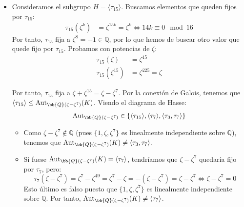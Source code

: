 \begin{ejemplo}
\begin{itemize}
\begin{itemize}
            Por tanto, $\Aut_{\bb{Q}(\zeta^3+\zeta^5)}(K) = \langle \tau_7\rangle$, y por la conexión de Galois:
            \begin{equation*}
                K^{\langle \tau_7\rangle} = \bb{Q}(\zeta^3+\zeta^5)
            \end{equation*}

            \item Consideramos el subgrupo $H = \langle \tau_{15}\rangle$. Buscamos elementos que queden fijos por $\tau_{15}$:
            \begin{align*}
                \tau_{15}(\zeta^k) &= \zeta^{15k} = \zeta^k \iff 14k \equiv 0 \mod 16
            \end{align*}
            Por tanto, $\tau_{15}$ fija a $\zeta^8=-1\in \mathbb{Q}$, por lo que hemos de buscar otro valor que quede fijo por $\tau_{15}$. Probamos con potencias de $\zeta$:
            \begin{align*}
                \tau_{15}(\zeta) &= \zeta^{15} \\
                \tau_{15}(\zeta^{15}) &= \zeta^{225} = \zeta
            \end{align*}

            Por tanto, $\tau_{15}$ fija a $\zeta+\zeta^{15}=\zeta-\zeta^7$. Por la conexión de Galois, tenemos que $\langle \tau_{15}\rangle\leq \Aut_{\bb{Q}(\zeta-\zeta^7)}(K)$. Viendo el diagrama de Hasse:
            \begin{equation*}
                \Aut_{\bb{Q}(\zeta-\zeta^7)} \in \{\langle \tau_{15}\rangle, \langle \tau_7\rangle, \langle \tau_3, \tau_7\rangle\}
            \end{equation*}
            \begin{itemize}
                \item Como $\zeta-\zeta^7\notin \mathbb{Q}$ (pues $\{1,\zeta,\zeta^{7}\}$ es linealmente independiente sobre $\mathbb{Q}$), tenemos que $\Aut_{\bb{Q}(\zeta-\zeta^7)}(K)\neq \langle \tau_3, \tau_7\rangle$.
                \item Si fuese $\Aut_{\bb{Q}(\zeta-\zeta^7)}(K) = \langle \tau_7\rangle$, tendríamos que $\zeta-\zeta^7$ quedaría fijo por $\tau_7$, pero:
                \begin{equation*}
                    \tau_7(\zeta-\zeta^7) = \zeta^7-\zeta^{49} = \zeta^7-\zeta = -(\zeta-\zeta^7)= \zeta-\zeta^7\iff \zeta-\zeta^7 = 0
                \end{equation*}
                Esto último es falso puesto que $\{1,\zeta,\zeta^7\}$ es linealmente independiente sobre $\mathbb{Q}$. Por tanto, $\Aut_{\bb{Q}(\zeta-\zeta^7)}(K)\neq \langle \tau_7\rangle$.
            \end{itemize}


\end{itemize}
\end{itemize}
\end{ejemplo}
